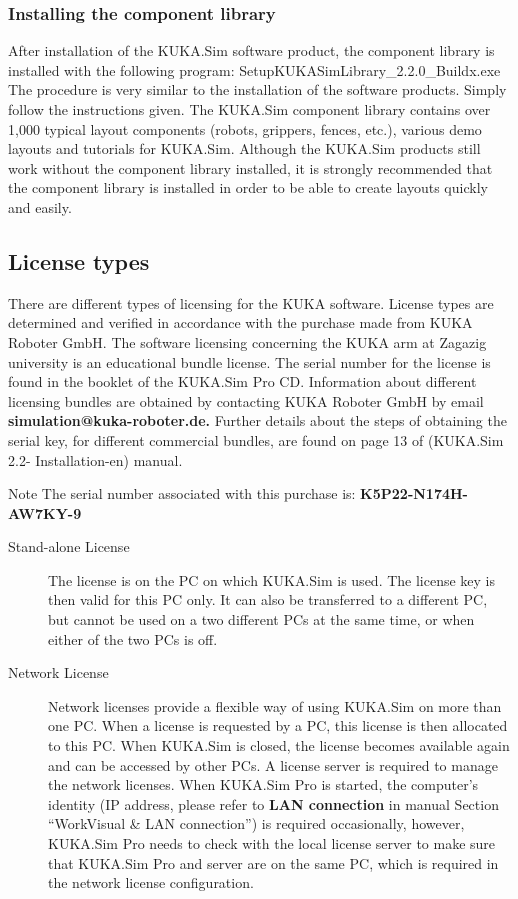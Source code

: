 \subsubsection*{Installing the component library }
After installation of the KUKA.Sim software product, the component library is installed with the following program: SetupKUKASimLibrary\_2.2.0\_Buildx.exe The procedure is very similar to the installation of the software products. Simply follow the instructions given.
The KUKA.Sim component library contains over 1,000 typical layout components (robots, grippers, fences, etc.), various demo layouts and tutorials for KUKA.Sim. Although the KUKA.Sim products still work without the component library installed, it is strongly recommended that the component library is installed in order to be able to create layouts quickly and easily.

\subsection{License types}
There are different types of licensing for the KUKA software. License types are determined and verified in accordance with the purchase made from KUKA Roboter GmbH. 
The software licensing concerning the KUKA arm at Zagazig university is an educational bundle license. The serial number for the license is found in the booklet of the KUKA.Sim Pro CD. Information about different licensing bundles are obtained by contacting KUKA Roboter GmbH by email
\textbf {simulation@kuka-roboter.de.}
Further details about the steps of obtaining the serial key, for different commercial bundles,  are found on page 13 of (KUKA.Sim 2.2- Installation-en) manual.
\begin{mynotebox}{Note}
The serial number associated with this purchase is: \textbf {K5P22-N174H-AW7KY-9}
\end{mynotebox}
	\begin{description}
    \item[Stand-alone License]
	The license is on the PC on which KUKA.Sim is used. The license key is then valid for this PC only. It can also be transferred to a different PC, but cannot be used on a two different PCs at the same time, or when either of the two PCs is off.
        \item[Network License]
	Network licenses provide a flexible way of using KUKA.Sim on more than one PC. When a license is requested by a PC, this license is then allocated to this PC. When KUKA.Sim is closed, the license becomes available again and can be accessed by other PCs. 
	A license server is required to manage the network licenses. When KUKA.Sim Pro is started, the computer’s identity (IP address, please refer to \textbf {LAN connection} in manual Section “WorkVisual \& LAN connection”) is required occasionally, however, KUKA.Sim Pro needs to check with the local license server to make sure that KUKA.Sim Pro and server are on the same PC, which is required in the network license configuration.
   \end{description}

